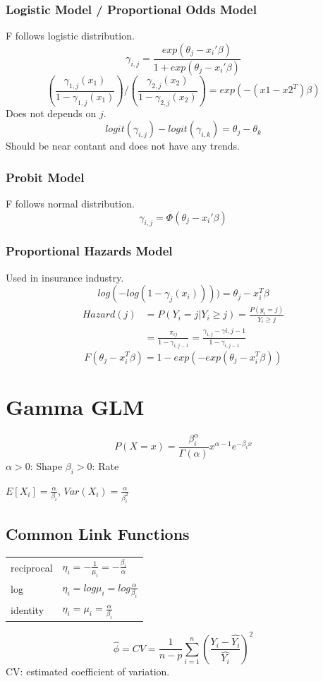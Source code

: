 \documentclass[10pt,landscape, fleqn]{article}
\begin{document}
\begin{multicols}{3}
				\subsubsection{Logistic Model / Proportional Odds Model}
					F follows logistic distribution.
					\[ \gamma_{i,j} = \frac{exp(\theta_j-x_i'\beta)}{1+exp(\theta_j-x_i'\beta)} \]
					\[ \left( \frac{\gamma_{1,j}(x_1)}{1-\gamma_{1,j}(x_1)}\right) / \left( \frac{\gamma_{2,j}(x_2)}{1-\gamma_{2,j}(x_2)} \right) = exp(-(x1-x2^T)\beta) \]
					Does not depends on $j$.
					\[ logit(\gamma_{i,j}) - logit(\gamma_{i,k}) = \theta_j - \theta_k \]
					Should be near contant and does not have any trends.
				\subsubsection{Probit Model}
					F follows normal distribution.
					\[ \gamma_{i,j} = \Phi(\theta_j-x_i'\beta) \]
				\subsubsection{Proportional Hazards Model}
					Used in insurance industry.
					\[ log(-log(1-\gamma_j(x_i)))) = \theta_j - x_i^T\beta \]
					\[ 
						\begin{split}
							Hazard(j) &= P(Y_i = j|Y_i \geq j) = \frac{P(y_i=j)}{Y_i\geq j} \\
							          &= \frac{\pi_{ij}}{1-\gamma_{i,j-1}} = \frac{\gamma_{i,j} - \gamma{i,j-1}}{1-\gamma_{i,j-1}}
						\end{split}
					\]
					\[ F(\theta_j-x_i^T\beta) = 1 - exp(-exp(\theta_j-x_i^T\beta))\]
	
		\section{Gamma GLM}
			\[ P(X = x) = \frac{\beta_i^\alpha}{\Gamma(\alpha)}x^{\alpha-1}e^{-\beta_i x} \]
			$\alpha > 0$: Shape $\beta_i > 0$: Rate \par 
			$E[X_i] = \frac{\alpha}{\beta_i}$, $Var(X_i) =\frac{\alpha}{\beta_i^2} $
			\subsection{Common Link Functions}
			\begin{tabular}{l l}
				reciprocal & $\eta_i = -\frac{1}{\mu_i} = -\frac{\beta_i}{\alpha} $ \\
				log & $\eta_i = log\mu_i = log\frac{\alpha}{\beta_i} $\\
				identity & $\eta_i = \mu_i = \frac{\alpha}{\beta_i}$\\
			\end{tabular}
			\[ \hat{\phi} = CV = \frac{1}{n-p}\sum_{i=1}^{n}\left(\frac{Y_i - \hat{Y_i}}{\hat{Y_i}}\right)^2 \]
			CV: estimated coefficient of variation.
			

\end{multicols}
\end{document}

